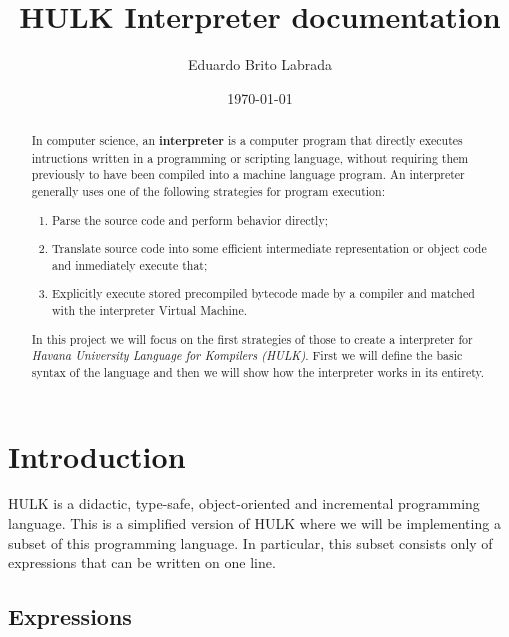 \documentclass[a4paper, 12pt]{report}
\begin{document}
\title{\bf HULK Interpreter documentation}
\author{Eduardo Brito Labrada}
\date{\today}
\maketitle

\begin{abstract}
  In computer science, an {\bf interpreter} is a computer program that directly executes
  intructions written in a programming or scripting language, without requiring them previously
  to have been compiled into a machine language program. An interpreter generally uses one of the
  following strategies for program execution:

  \begin{enumerate}
    \item Parse the source code and perform behavior directly;
    \item Translate source code into some efficient intermediate representation or object code
          and inmediately execute that;
    \item Explicitly execute stored precompiled bytecode made by a compiler and matched with the
          interpreter Virtual Machine.
  \end{enumerate}

  In this project we will focus on the first strategies of those to create a interpreter for
    {\em Havana University Language for Kompilers (HULK)}. First we will define the basic syntax of the
  language and then we will show how the interpreter works in its entirety.
\end{abstract}

\tableofcontents

\newpage

\section*{Introduction}

HULK is a didactic, type-safe, object-oriented and incremental programming language. This is a simplified
version of HULK where we will be implementing a subset of this programming language. In particular, this
subset consists only of expressions that can be written on one line.

\subsection*{Expressions}
\end{document}
